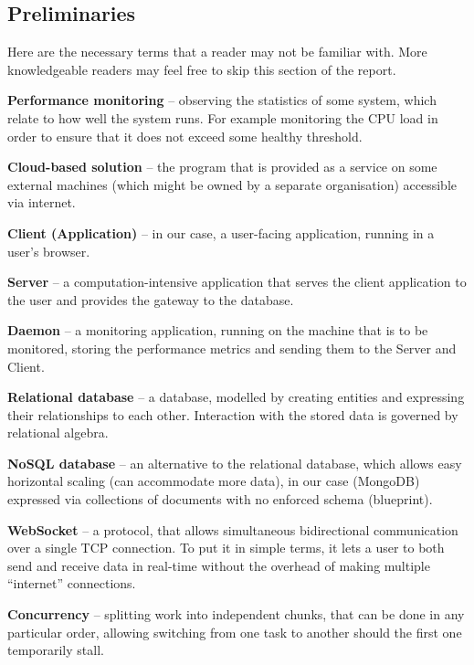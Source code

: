 \documentclass{l3proj}
\begin{document}

\begin{appendices}

\chapter{Preliminaries}
\label{prelim}

Here are the necessary terms that a reader may not be familiar with. More knowledgeable readers may feel free to skip this section of the report.

\textbf{Performance monitoring} -- observing the statistics of some system, which relate to how well the system runs. For example monitoring the CPU load in order to ensure that it does not exceed some healthy threshold.

\textbf{Cloud-based solution} -- the program that is provided as a service on some external machines (which might be owned by a separate organisation) accessible via internet.

\textbf{Client (Application)} -- in our case, a user-facing application, running in a user’s browser.

\textbf{Server} -- a computation-intensive application that serves the client application to the user and provides the gateway to the database.

\textbf{Daemon} -- a monitoring application, running on the machine that is to be monitored, storing the performance metrics and sending them to the Server and Client.

\textbf{Relational database} -- a database, modelled by creating entities and expressing their relationships to each other. Interaction with the stored data is governed by relational algebra.

\textbf{NoSQL database} -- an alternative to the relational database, which allows easy horizontal scaling (can accommodate more data), in our case (MongoDB) expressed via collections of documents with no enforced schema (blueprint).

\textbf{WebSocket} -- a protocol, that allows simultaneous bidirectional communication over a single TCP connection. To put it in simple terms, it lets a user to both send and receive data in real-time without the overhead of making multiple ``internet'' connections.

\textbf{Concurrency} -- splitting work into independent chunks, that can be done in any particular order, allowing switching from one task to another should the first one temporarily stall.


\end{appendices}
\end{document}
